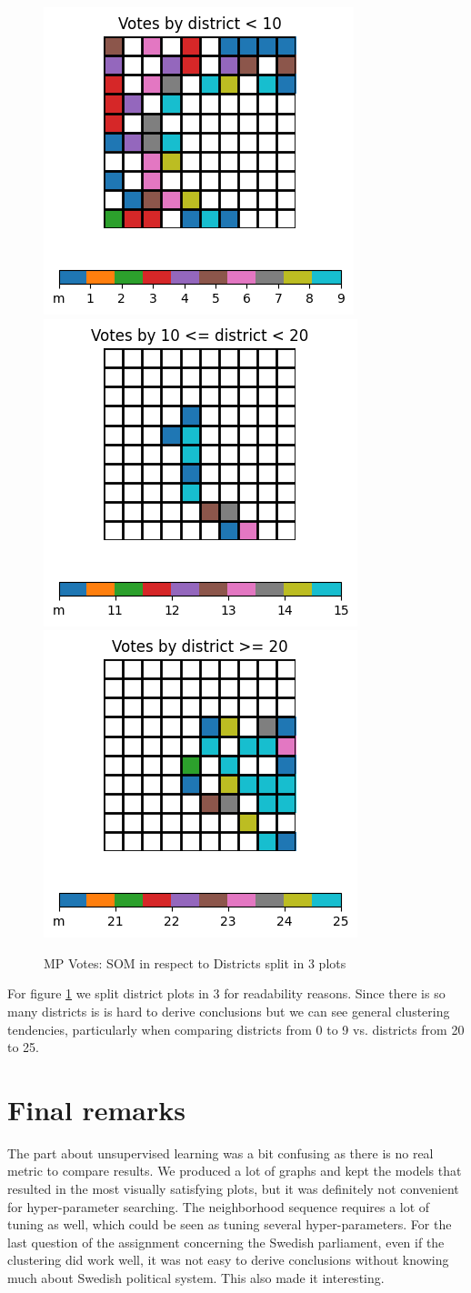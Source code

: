 \documentclass[a4paper]{article}
\begin{document}
\begin{figure}[h!]
    \centering
    \includegraphics[width=.25\linewidth]{img/SOM_mp_d10.png}
    \includegraphics[width=.25\linewidth]{img/SOM_mp_d20.png}
    \includegraphics[width=.25\linewidth]{img/SOM_mp_d30.png}
    \caption{MP Votes: SOM in respect to Districts split in 3 plots}
    \label{fig:SOM_MP_D}
\end{figure}

For figure \ref{fig:SOM_MP_D} we split district plots in 3 for readability reasons. Since there is so many districts is is hard to derive conclusions but we can see general clustering tendencies, particularly when comparing districts from 0 to 9 vs. districts from 20 to 25.



\section{Final remarks} %
The part about unsupervised learning was a bit confusing as there is no real metric to compare results. We produced a lot of graphs and kept the models that resulted in the most visually satisfying plots, but it was definitely not convenient for hyper-parameter searching. The neighborhood sequence requires a lot of tuning as well, which could be seen as tuning several hyper-parameters.
For the last question of the assignment concerning the Swedish parliament, even if the clustering did work well, it was not easy to derive conclusions without knowing much about Swedish political system. This also made it interesting.
\end{document}
